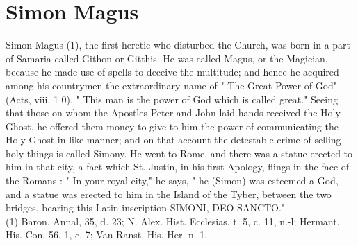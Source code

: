 \documentclass[12pt]{book}
\begin{document}
\section{Simon Magus}
Simon Magus (1), the first heretic who disturbed the Church, was born in a part of Samaria called
Githon or Gitthis. He was called Magus, or the Magician, because he made use of spells to deceive the
multitude; and hence he acquired among his countrymen the extraordinary name of " The Great Power
of God" (Acts, viii, 1 0). " This man is the power of God which is called great." Seeing that those on whom
the Apostles Peter and John laid hands received the Holy Ghost, he offered them money to give to him
the power of communicating the Holy Ghost in like manner; and on that account the detestable crime of
selling holy things is called Simony. He went to Rome, and there was a statue erected to him in that city, a
fact which St. Justin, in his first Apology, flings in the face of the Romans : " In your royal city," he says, "
he (Simon) was esteemed a God, and a statue was erected to him in the Island of the Tyber, between the
two bridges, bearing this Latin inscription SIMONI, DEO SANCTO."\\
(1) Baron. Annal, 35, d. 23; N. Alex. Hist. Ecclesias. t. 5, c. 11, n.-l; Hermant. His. Con. 56, 1, c. 7; Van
Ranst, His. Her. n. 1.
\end{document}
